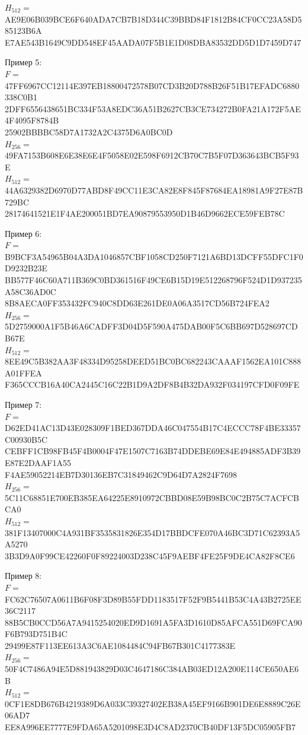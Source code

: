 {$H_{512}=\;$AE9E06B039BCE6F640ADA7CB7B18D344C39BBD84F1812B84CF0CC23A58D585123B6A\\E7AE543B1649C9DD548EF45AADA07F5B1E1D08DBA83532DD5D1D7459D747
\par
Пример 5:\\
$F=\;$47FF6967CC12114E397EB18800472578B07CD3B20D788B26F51B17EFADC6880338C0B1\\2DFF6556438651BC334F53A8EDC36A51B2627CB3CE734272B0FA21A172F5AE4F4095F8784B\\25902BBBBC58D7A1732A2C4375D6A0BC0D\\
$H_{256}=\;$49FA7153B608E6E38E6E4F5058E02E598F6912CB70C7B5F07D363643BCB5F93E\\
$H_{512}=\;$44A6329382D6970D77ABD8F49CC11E3CA82E8F845F87684EA18981A9F27E87B729BC\\28174641521E1F4AE200051BD7EA90879553950D1B46D9662ECE59FEB78C
\par
Пример 6:\\
$F=\;$B9BCF3A54965B04A3DA1046857CBF1058CD250F7121A6BD13DCFF55DFC1F0D9232B23E\\BB577F46C60A711B369C0BD361516F49CE6B15D19E512268796F524D1D937235A58C36AD0C\\8B8AECA0FF353432FC940C8DD63E261DE0A06A3517CD56B724FEA2\\
$H_{256}=\;$5D2759000A1F5B46A6CADFF3D04D5F590A475DAB00F5C6BB697D528697CDB67E\\
$H_{512}=\;$8EE49C5B382AA3F48334D95258DEED51BC0BC682243CAAAF1562EA101C888A01FFEA\\F365CCCB16A40CA2445C16C22B1D9A2DF8B4B32DA932F034197CFD0F09FE
\par
Пример 7:\\
$F=\;$D62ED41AC13D43E028309F1BED367DDA46C047554B17C4ECCC78F4BE33357C00930B5C\\CEBFF1CB98FB45F4B0004F47E1507C7163B74DDEBE69E84E494885ADF3B39E87E2DAAF1A55\\F4AE59052214EB7D30136EB7C31849462C9D64D7A2824F7698\\
$H_{256}=\;$5C11C68851E700EB385EA64225E8910972CBBD08E59B98BC0C2B75C7ACFCBCA0\\
$H_{512}=\;$381F13407000C4A931BF3535831826E354D17BBDCFE070A46BC3D71C62393A5A5270\\3B3D9A0F99CE42260F0F89224003D238C45F9AEBF4FE25F9DE4CA82F8CE6
\par
Пример 8:\\
$F=\;$FC62C76507A0611B6F08F3D89B55FDD1183517F52F9B5441B53C4A43B2725EE36C2117\\88B5CB0CCD56A7A9415254020ED9D1691A5FA3D1610D85AFCA551D69FCA90F6B793D751B4C\\29499E87F113EE613A3C6AE1084484C94FB67B301C4177383E\\
$H_{256}=\;$50F4C7486A94E5D881943829D03C4647186C384AB03ED12A200E114CE650AE6B\\
$H_{512}=\;$0CF1E8DB676B4219389D6A033C39327402EB38A45EF9166B901DE6E8889C26E06AD7\\EE8A996EE7777E9FDA65A5201098E3D4C8AD2370CB40DF13F5DC05905FB7
}
